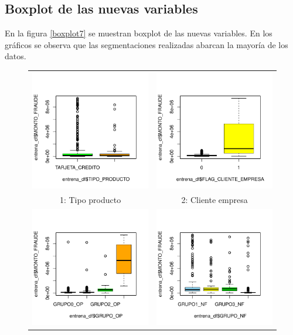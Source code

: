 \documentclass[
	11pt, %
	spanish, %
]{fphw}
\begin{document}
\subsection*{Boxplot de las nuevas variables}
En la figura \ref{boxplot7} se muestran boxplot de las nuevas variables.
En los gráficos se observa que las segmentaciones realizadas abarcan la mayoría de los datos.
\begin{figure}[h!]
\centering
\begin{tabular}{| p{6cm} | p{6cm} |}
\hline
\vspace{2mm} \includegraphics[width=55mm]{box1} & \vspace{2mm} \includegraphics[width=55mm]{box2} \\ 
\multicolumn{1}{|c|}{\small 1: Tipo producto} & \multicolumn{1}{c|}{\small 2: Cliente empresa} \\ \hline
\vspace{2mm} \includegraphics[width=55mm]{box3} & \vspace{2mm} \includegraphics[width=55mm]{box4} \\ 

\end{tabular}
\end{figure}
\end{document}
